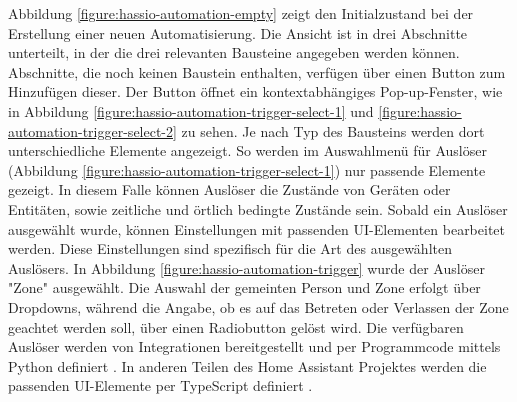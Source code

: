 Abbildung \ref{figure:hassio-automation-empty} zeigt den Initialzustand bei der Erstellung einer neuen Automatisierung. Die Ansicht ist in drei Abschnitte unterteilt, in der die drei relevanten Bausteine angegeben werden können. Abschnitte, die noch keinen Baustein enthalten, verfügen über einen Button zum Hinzufügen dieser. Der Button öffnet ein kontextabhängiges Pop-up-Fenster, wie in Abbildung \ref{figure:hassio-automation-trigger-select-1} und \ref{figure:hassio-automation-trigger-select-2} zu sehen. Je nach Typ des Bausteins werden dort unterschiedliche Elemente angezeigt. So werden im Auswahlmenü für Auslöser (Abbildung \ref{figure:hassio-automation-trigger-select-1}) nur passende Elemente gezeigt. In diesem Falle können Auslöser die Zustände von Geräten oder Entitäten, sowie zeitliche und örtlich bedingte Zustände sein. Sobald ein Auslöser ausgewählt wurde, können Einstellungen mit passenden UI-Elementen bearbeitet werden. Diese Einstellungen sind spezifisch für die Art des ausgewählten Auslösers. In Abbildung \ref{figure:hassio-automation-trigger} wurde der Auslöser "Zone" ausgewählt. Die Auswahl der gemeinten Person und Zone erfolgt über Dropdowns, während die Angabe, ob es auf das Betreten oder Verlassen der Zone geachtet werden soll, über einen Radiobutton gelöst wird.  Die verfügbaren Auslöser werden von Integrationen bereitgestellt und per Programmcode mittels Python definiert \parencite{homeassistantDeviceAutomations2023}. In anderen Teilen des Home Assistant Projektes werden die passenden \ac{UI}-Elemente per TypeScript definiert \parencite{homeassistantHomeassistantFrontend}.

